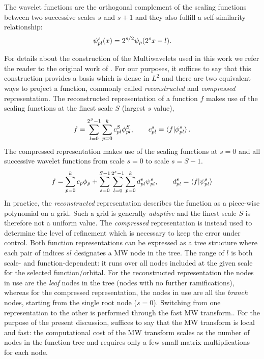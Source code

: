 \documentclass[journal=jctcce, manuscript=article]{achemso}
\begin{document}
The wavelet functions are  the orthogonal complement of the scaling functions between two successive scales $s$ and $s+1$ and they also fulfill a self-similarity relationship:
\begin{equation}
    \psi^s_{pl}(x) = 2^{s/2} \psi_p(2^s x - l).
\end{equation}

For details about the construction of the Multiwavelets used in this work we refer the reader to the original work of \citeauthor{Alpert.10.1137/0524016}. \cite{Alpert.10.1137/0524016}
For our purposes, it suffices to say that this construction provides a basis which is dense in $L^2$ and there are two equivalent ways to project a function, commonly called \emph{reconstructed} and \emph{compressed} representation. The reconstructed representation of a function $f$ makes use of the scaling functions at the finest scale $S$ (largest $s$ value), 
\begin{equation}\label{eq:reconstructed_func}
  f = \sum_{l=0}^{2^S-1}\sum_{p=0}^k c^S_{pl} \phi^S_{pl}, \qquad c^s_{pl} = \braket{f | \phi^s_{pl}}. 
\end{equation}
The compressed representation makes use of the scaling functions at $s=0$ and all successive wavelet functions from scale $s=0$ to scale $s=S-1$.
\begin{equation}\label{eq:compressed_func}
  f = \sum_{p=0}^k c_{p} \phi_p + \sum_{s=0}^{S-1} \sum_{l=0}^{2^s-1} \sum_{p=0}^k d^s_{pl} \psi^s_{pl}, \qquad d^s_{pl} = \braket{f | \psi^s_{pl}}
\end{equation}
In practice, the \emph{reconstructed} representation describes the function as a piece-wise polynomial on a grid. Such a grid is generally \emph{adaptive} and the finest scale $S$ is therefore not a uniform value. The \emph{compressed} representation is instead used to determine the level of refinement which is necessary to keep the error under control.  Both function representations can be expressed as a tree structure where each pair of indices $sl$ designates a \ac{MW} node in the tree. The range of $l$ is both scale- and function-dependent: it runs over all nodes included at the given scale for the selected function/orbital. For the reconstructed representation the nodes in use are the \emph{leaf} nodes in the tree (nodes with no further ramifications), whereas for the compressed representation, the nodes in use are all the \emph{branch} nodes, starting from the single root node ($s=0$).
Switching from one representation to the other is performed through the fast \ac{MW} transform.\cite{Beylkin.10.1002/cpa.3160440202,Frediani.10.1080/00268976.2013.810793}. For the purpose of the present discussion, suffices to say that the \ac{MW} transform is local and fast: the computational cost of the \ac{MW} transform scales as the number of nodes in the function tree and requires only a few small matrix multiplications for each node.
\end{document}
